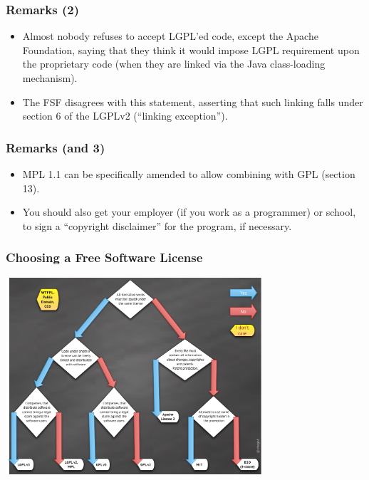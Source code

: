 \documentclass{beamer}
\begin{document}

\begin{frame}
\frametitle{Remarks (2)}

\begin{itemize}
\item Almost nobody refuses to accept LGPL'ed code, except the Apache Foundation, saying that they think it would impose LGPL requirement upon the proprietary code (when they are linked via the Java class-loading mechanism).
\item The FSF disagrees with this statement, asserting that such linking falls under section 6 of the LGPLv2 (``linking exception'').
\end{itemize}

\end{frame}


\begin{frame}
\frametitle{Remarks (and 3)}

\begin{itemize}
\item MPL 1.1 can be specifically amended to allow combining with GPL (section 13).
\item You should also get your employer (if you work as a programmer) or school, to sign a ``copyright disclaimer'' for the program, if necessary. 
\end{itemize}

\end{frame}


\begin{frame}
\frametitle{Choosing a Free Software License}

\begin{center}
\includegraphics[width=9.5cm]{figs/licencias_SL_diagrama.png}
\end{center}

\end{frame}
\end{document}
